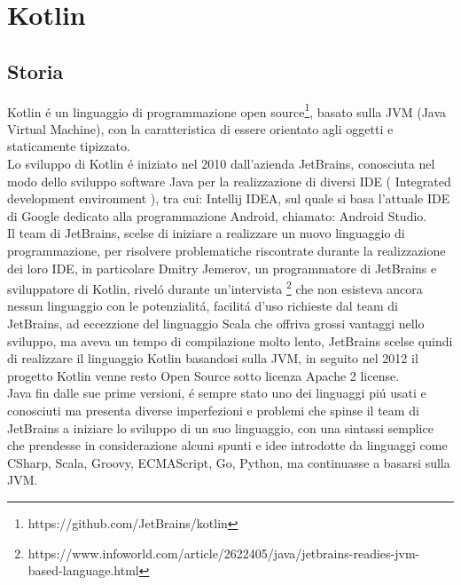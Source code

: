 \chapter{Kotlin}                %
\lhead[\fancyplain{}{\bfseries\thepage}]{\fancyplain{}{\bfseries\rightmark}}
\section{Storia}                 %

Kotlin \'e un linguaggio di programmazione open source\footnote{https://github.com/JetBrains/kotlin}, basato sulla JVM (Java Virtual Machine), con la caratteristica di essere orientato agli oggetti e staticamente tipizzato. \\
Lo sviluppo di Kotlin \'e iniziato nel 2010 dall'azienda JetBrains, conosciuta nel modo dello sviluppo software Java per la realizzazione di diversi IDE ( Integrated development environment ), tra cui: Intellij IDEA, sul quale si basa l'attuale IDE di Google dedicato alla programmazione Android, chiamato: Android Studio.\\
Il team di JetBrains, scelse di iniziare a realizzare un nuovo linguaggio di programmazione, per risolvere problematiche riscontrate durante la realizzazione dei loro IDE, in particolare Dmitry Jemerov, un programmatore di JetBrains e sviluppatore di Kotlin, rivel\'o durante un'intervista \footnote{https://www.infoworld.com/article/2622405/java/jetbrains-readies-jvm-based-language.html} che non esisteva ancora nessun linguaggio con le potenzialit\'a, facilit\'a d'uso richieste dal team di JetBrains, ad eccezzione del linguaggio Scala che offriva grossi vantaggi nello sviluppo, ma aveva un tempo di compilazione molto lento, JetBrains scelse quindi di realizzare il linguaggio Kotlin basandosi sulla JVM, in seguito nel 2012 il progetto Kotlin venne resto Open Source sotto licenza Apache 2 license.\\
Java fin dalle sue prime versioni, \'e sempre stato uno dei linguaggi  pi\'u usati e conosciuti ma presenta diverse imperfezioni e problemi che spinse il team di JetBrains a iniziare lo sviluppo di un suo linguaggio, con una sintassi semplice che prendesse in considerazione alcuni spunti e idee introdotte da linguaggi come CSharp, Scala, Groovy, ECMAScript, Go, Python, ma continuasse a basarsi sulla JVM.\\
